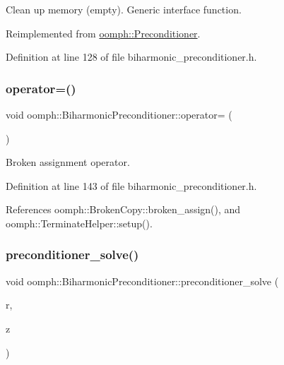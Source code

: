 Clean up memory (empty). Generic interface function. 



Reimplemented from \hyperlink{classoomph_1_1Preconditioner_a46c31c416829bedcd9db238431262027}{oomph\+::\+Preconditioner}.



Definition at line 128 of file biharmonic\+\_\+preconditioner.\+h.

\mbox{\label{classoomph_1_1BiharmonicPreconditioner_a14371fe8cc3e28618018a75d83499ea5}} 
\subsubsection{\texorpdfstring{operator=()}{operator=()}}
{\footnotesize\ttfamily void oomph\+::\+Biharmonic\+Preconditioner\+::operator= (\begin{DoxyParamCaption}\item[{const \hyperlink{classoomph_1_1BiharmonicPreconditioner}{Biharmonic\+Preconditioner} \&}]{ }\end{DoxyParamCaption})\hspace{0.3cm}{\ttfamily [inline]}}



Broken assignment operator. 



Definition at line 143 of file biharmonic\+\_\+preconditioner.\+h.



References oomph\+::\+Broken\+Copy\+::broken\+\_\+assign(), and oomph\+::\+Terminate\+Helper\+::setup().

\mbox{\label{classoomph_1_1BiharmonicPreconditioner_a205babb3fe007ed93113a0c52ee4cf7d}} 
\subsubsection{\texorpdfstring{preconditioner\+\_\+solve()}{preconditioner\_solve()}}
{\footnotesize\ttfamily void oomph\+::\+Biharmonic\+Preconditioner\+::preconditioner\+\_\+solve (\begin{DoxyParamCaption}\item[{const \hyperlink{classoomph_1_1DoubleVector}{Double\+Vector} \&}]{r,  }\item[{\hyperlink{classoomph_1_1DoubleVector}{Double\+Vector} \&}]{z }\end{DoxyParamCaption})\hspace{0.3cm}{\ttfamily [virtual]}}



